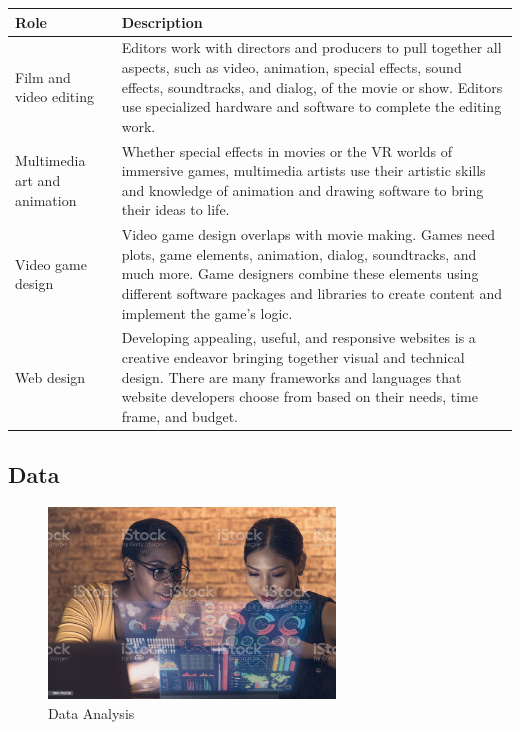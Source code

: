 \begin{table}[H]
	\begin{center}
		\begin{tabular}{p{1in}|p{3.4in}} 
			\textbf{Role} & \textbf{Description}\\
			\hline
			Film and video editing & Editors work with directors and producers to pull together all aspects, such as video, animation, special effects, sound effects, soundtracks, and dialog, of the movie or show. Editors use specialized hardware and software to complete the editing work.\\
			\hline
			Multimedia art and animation & Whether special effects in movies or the VR worlds of immersive games, multimedia artists use their artistic skills and knowledge of animation and drawing software to bring their ideas to life.\\
			\hline
			Video game design & Video game design overlaps with movie making. Games need plots, game elements, animation, dialog, soundtracks, and much more. Game designers combine these elements using different software packages and libraries to create content and implement the game's logic.\\
			\hline
			Web design & Developing appealing, useful, and responsive websites is a creative endeavor bringing together visual and technical design. There are many frameworks and languages that website developers choose from based on their needs, time frame, and budget.\\
			\hline
		\end{tabular}
	\end{center}
\end{table}


\subsection{Data}

\begin{figure}[H]
	\begin{center}
		\caption{Data Analysis}
		\vskip 4pt
		\includegraphics[height=2in]{images/careers/istockphoto-1364769258-1024x1024.jpg}
	\end{center}
\end{figure}

